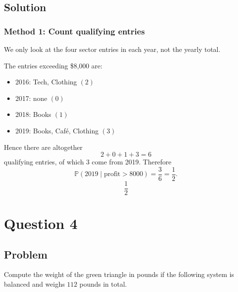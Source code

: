 \documentclass[12pt]{article}
\begin{document}
\subsection{Solution}
\subsubsection{Method 1: Count qualifying entries}
We only look at the four sector entries in each year, not the yearly total.

The entries exceeding \$8{,}000 are:
\begin{itemize}
    \item 2016: Tech, Clothing \hfill $(2)$
    \item 2017: none \hfill $(0)$
    \item 2018: Books \hfill $(1)$
    \item 2019: Books, Caf\'e, Clothing \hfill $(3)$
\end{itemize}
Hence there are altogether
\[
2+0+1+3=6
\]
qualifying entries, of which $3$ come from 2019. Therefore
\[
\mathbb{P}(\text{2019}\mid \text{profit}>8000)=\frac{3}{6}=\frac{1}{2}.
\]
\[
\boxed{\frac{1}{2}}
\]

\newpage
\section{Question 4}
\subsection{Problem}
Compute the weight of the green triangle in pounds if the following system is balanced and weighs $112$ pounds in total.
\end{document}
